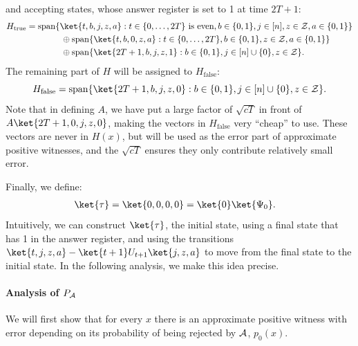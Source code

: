 \documentclass{toc}
\begin{document}
and accepting states, whose answer register is set to 1 at time $2T+1$:
\begin{align*}
H_{\mathrm{true}} &= \mathrm{span}\{\ket{t,b,j,z,a}:t\in\{0,\dots,2T\}\mbox{ is even},b\in\{0,1\}, j\in[n], z\in{\cal Z},a\in\{0,1\}\}\\
&\qquad\qquad \oplus \mathrm{span}\{\ket{t,b,0,z,a}:t\in\{0,\dots,2T\}, b\in \{0,1\},z\in {\cal Z},a\in \{0,1\}\}\\
& \qquad\qquad \oplus \mathrm{span}\{\ket{2T+1,b,j,z,1}:b\in\{0,1\},j\in[n]\cup\{0\},z\in{\cal Z}\}.
\end{align*}
The remaining part of $H$ will be assigned to $H_{\mathrm{false}}$:
$$H_{\mathrm{false}}=\mathrm{span}\{\ket{2T+1,b,j,z,0}:b\in\{0,1\},j\in [n]\cup\{0\},z\in{\cal Z}\}.$$
Note that in defining $A$, we have put a large factor of $\sqrt{cT}$ in front of $A\ket{2T+1,0,j,z,0}$, making the vectors in $H_{\mathrm{false}}$ very ``cheap'' to use. These vectors are never in $H(x)$, but will be used as the error part of approximate positive witnesses, and the $\sqrt{cT}$ ensures they only contribute relatively small error. 

Finally, we define: 
\begin{align*}
\ket{\tau} &= \ket{0,0,0,0}=\ket{0}\ket{\Psi_0}.
\end{align*}
Intuitively, we can construct $\ket{\tau}$, the initial state, using a final state that has 1 in the answer register, and using the transitions $\ket{t,j,z,a}-\ket{t+1}U_{t+1}\ket{j,z,a}$ to move from the final state to the initial state. In the following analysis, we make this idea precise. 

\paragraph{Analysis of $P_{\cal A}$} We will first show that for every $x$ there is an approximate positive witness with error depending on its probability of being rejected by $\cal A$, $p_0(x)$.
\end{document}
